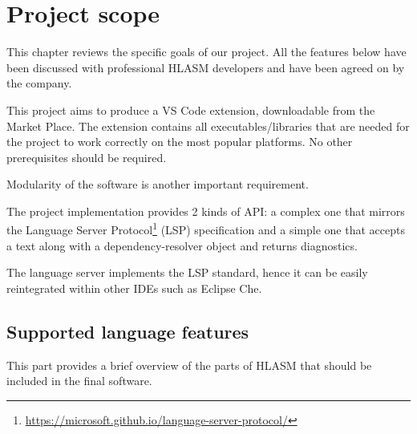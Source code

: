 \chapter{Project scope}

This chapter reviews the specific goals of our project.
All the features below have been discussed with professional HLASM developers and have been agreed on by the company.

This project aims to produce a VS Code extension, downloadable from the Market Place. The extension contains all executables/libraries that are needed for the project to work correctly on the most popular platforms. No other prerequisites should be required.

Modularity of the software is another important requirement. 

The project implementation provides 2 kinds of API: a complex one that mirrors the Language Server Protocol\footnote{\url{https://microsoft.github.io/language-server-protocol/}} (LSP) specification and a simple one that accepts a text along with a dependency-resolver object and returns diagnostics. 

The language server implements the LSP standard, hence it can be easily reintegrated within other IDEs such as Eclipse Che.

\section{Supported language features}
This part provides a brief overview of the parts of HLASM that should be included in the final software.

